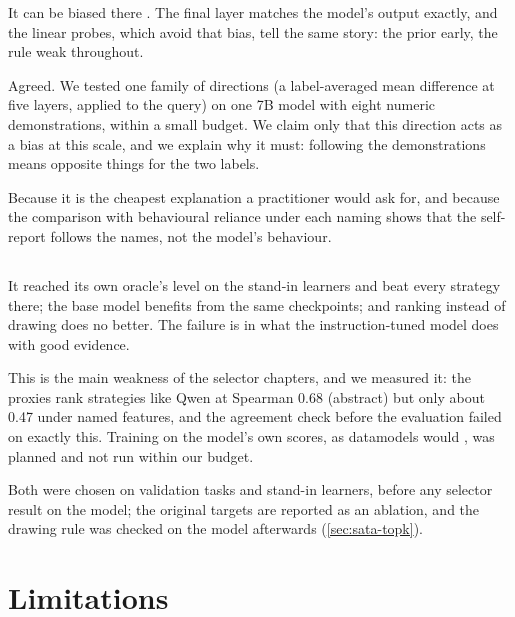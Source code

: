 {It can be biased there \citep{belrose2023eliciting}. The final layer matches the model's output exactly, and the linear probes, which avoid that bias, tell the same story: the prior early, the rule weak throughout.}

{Agreed. We tested one family of directions (a label-averaged mean difference at five layers, applied to the query) on one 7B model with eight numeric demonstrations, within a small budget. We claim only that this direction acts as a bias at this scale, and we explain why it must: following the demonstrations means opposite things for the two labels.}

{Because it is the cheapest explanation a practitioner would ask for, and because the comparison with behavioural reliance under each naming shows that the self-report follows the names, not the model's behaviour.}

\subsection*{}

{It reached its own oracle's level on the stand-in learners and beat every strategy there; the base model benefits from the same checkpoints; and ranking instead of drawing does no better. The failure is in what the instruction-tuned model does with good evidence.}

{This is the main weakness of the selector chapters, and we measured it: the proxies rank strategies like Qwen at Spearman 0.68 (abstract) but only about 0.47 under named features, and the agreement check before the \satami evaluation failed on exactly this. Training on the model's own scores, as datamodels would \citep{chang2023data}, was planned and not run within our budget.}

{Both were chosen on validation tasks and stand-in learners, before any selector result on the model; the original targets are reported as an ablation, and the drawing rule was checked on the model afterwards (\autoref{sec:sata-topk}).}

\section{Limitations}
\label{sec:limitations}

